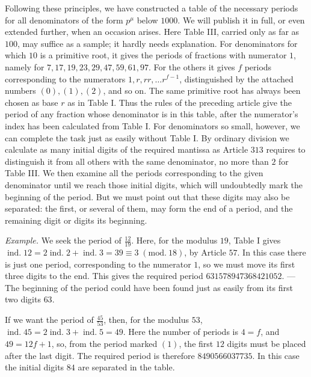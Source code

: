 Following these principles, we have constructed a table of the necessary periods for all denominators of the form \(p^\mu\) below \(1000\). We will publish it in full, or even extended further, when an occasion arises. Here Table III, carried only as far as \(100\), may suffice as a sample; it hardly needs explanation. For denominators for which \(10\) is a primitive root, it gives the periods of fractions with numerator \(1\), namely for \(7,17,19,23,29,47,59,61,97\). For the others it gives \(f\) periods corresponding to the numerators \(1,r,rr,\ldots r^{f-1}\), distinguished by the attached numbers \((0),(1),(2)\), and so on. The same primitive root has always been chosen as base \(r\) as in Table I. Thus the rules of the preceding article give the period of any fraction whose denominator is in this table, after the numerator's index has been calculated from Table I. For denominators so small, however, we can complete the task just as easily without Table I. By ordinary division we calculate as many initial digits of the required mantissa as Article \(313\) requires to distinguish it from all others with the same denominator, no more than \(2\) for Table III. We then examine all the periods corresponding to the given denominator until we reach those initial digits, which will undoubtedly mark the beginning of the period. But we must point out that these digits may also be separated: the first, or several of them, may form the end of a period, and the remaining digit or digits its beginning.

\textit{Example.} We seek the period of \(\frac{12}{19}\). Here, for the modulus \(19\), Table I
gives \(\operatorname{ind.}12=2\operatorname{ind.}2+\operatorname{ind.}3=39\equiv3\; (\mathrm{mod}.\ 18)\), by Article \(57\). In this case there is just one period, corresponding to the numerator \(1\), so we must move its first three digits to the end. This gives the required period \(631578947368421052\). — The beginning of the period could have been found just as easily from its first two digits \(63\).

If we want the period of \(\frac{45}{53}\), then, for the modulus \(53\), \(\operatorname{ind.}45=2\operatorname{ind.}3 +\operatorname{ind.}5=49\). Here the number of periods is \(4=f\), and \(49=12f+1\), so, from the period marked \((1)\), the first \(12\) digits must be placed after the last digit. The required period is therefore \(8490566037735\). In this case the initial digits \(84\) are separated in the table.

